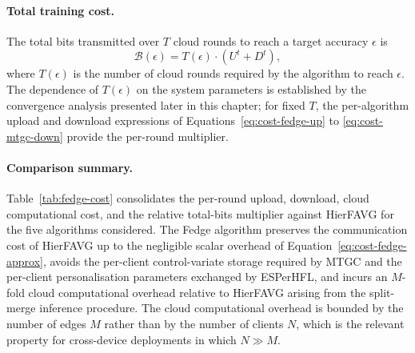 \paragraph{Total training cost.}
The total bits transmitted over $T$ cloud rounds to reach a target accuracy $\epsilon$ is
\begin{equation}
\label{eq:cost-total}
\mathcal{B}(\epsilon) = T(\epsilon) \cdot \left( U^{t} + D^{t} \right),
\end{equation}
where $T(\epsilon)$ is the number of cloud rounds required by the algorithm to reach $\epsilon$. The dependence of $T(\epsilon)$ on the system parameters is established by the convergence analysis presented later in this chapter; for fixed $T$, the per-algorithm upload and download expressions of Equations~\eqref{eq:cost-fedge-up} to \eqref{eq:cost-mtgc-down} provide the per-round multiplier.

\paragraph{Comparison summary.}
Table~\ref{tab:fedge-cost} consolidates the per-round upload, download, cloud computational cost, and the relative total-bits multiplier against HierFAVG for the five algorithms considered. The Fedge algorithm preserves the communication cost of HierFAVG up to the negligible scalar overhead of Equation~\eqref{eq:cost-fedge-approx}, avoids the per-client control-variate storage required by MTGC and the per-client personalisation parameters exchanged by ESPerHFL, and incurs an $M$-fold cloud computational overhead relative to HierFAVG arising from the split-merge inference procedure. The cloud computational overhead is bounded by the number of edges $M$ rather than by the number of clients $N$, which is the relevant property for cross-device deployments in which $N \gg M$.

